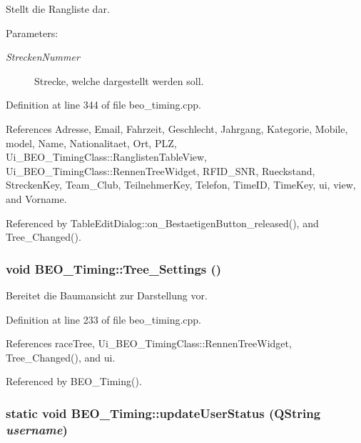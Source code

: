 Stellt die Rangliste dar. 

\begin{Desc}
\item[Parameters:]
\begin{description}
\item[{\em StreckenNummer}]Strecke, welche dargestellt werden soll. \end{description}
\end{Desc}


Definition at line 344 of file beo\_\-timing.cpp.

References Adresse, Email, Fahrzeit, Geschlecht, Jahrgang, Kategorie, Mobile, model, Name, Nationalitaet, Ort, PLZ, Ui\_\-BEO\_\-TimingClass::RanglistenTableView, Ui\_\-BEO\_\-TimingClass::RennenTreeWidget, RFID\_\-SNR, Rueckstand, StreckenKey, Team\_\-Club, TeilnehmerKey, Telefon, TimeID, TimeKey, ui, view, and Vorname.

Referenced by TableEditDialog::on\_\-BestaetigenButton\_\-released(), and Tree\_\-Changed().\hypertarget{class_b_e_o___timing_cd19a9b93fb9492e5ed537a8bc15af45}{
\subsubsection[Tree\_\-Settings]{\setlength{\rightskip}{0pt plus 5cm}void BEO\_\-Timing::Tree\_\-Settings ()}}
\label{class_b_e_o___timing_cd19a9b93fb9492e5ed537a8bc15af45}


Bereitet die Baumansicht zur Darstellung vor. 



Definition at line 233 of file beo\_\-timing.cpp.

References raceTree, Ui\_\-BEO\_\-TimingClass::RennenTreeWidget, Tree\_\-Changed(), and ui.

Referenced by BEO\_\-Timing().\hypertarget{class_b_e_o___timing_1f2db201ed52a7cd88c0b7b3c2113f2f}{
\subsubsection[updateUserStatus]{\setlength{\rightskip}{0pt plus 5cm}static void BEO\_\-Timing::updateUserStatus (QString {\em username})}}
\label{class_b_e_o___timing_1f2db201ed52a7cd88c0b7b3c2113f2f}




